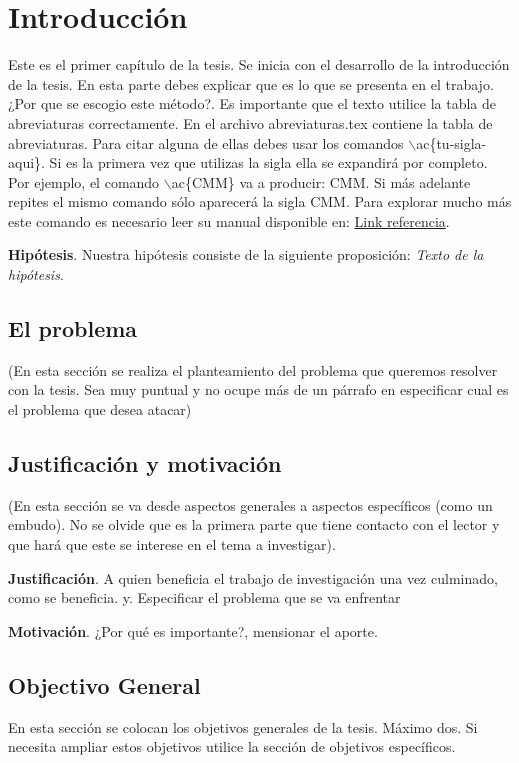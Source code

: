 \chapter{Introducción}
\label{chap:cha1}

Este es el primer capítulo de la tesis. Se inicia con el desarrollo de la introducción de la tesis. En esta parte debes explicar que es lo que se presenta en el trabajo. ¿Por que se escogio este método?. Es importante que el texto utilice la tabla de abreviaturas correctamente. En el archivo abreviaturas.tex contiene la tabla de abreviaturas. Para citar alguna de ellas debes usar los comandos $\backslash$ac\{tu-sigla-aqui\}. Si es la primera vez que utilizas la sigla ella se expandirá por completo. Por ejemplo, el comando $\backslash$ac\{CMM\} va a producir: \ac{CMM}. Si más adelante repites el mismo comando sólo aparecerá la sigla \ac{CMM}. Para explorar mucho más este comando es necesario leer su manual disponible en: \href{http://www.ctan.org/tex-archive/macros/latex/contrib/acronym/}{Link referencia}.


\textbf{Hipótesis}.
Nuestra hipótesis consiste de la siguiente proposición: \textit{ Texto de la hipótesis}.


\section{El problema}
(En esta sección se realiza el planteamiento del problema que queremos resolver con la tesis. Sea muy puntual y no ocupe más de un párrafo en especificar cual es el problema que desea atacar)


\section{Justificación y motivación}
(En esta sección se va desde aspectos generales a aspectos específicos (como un embudo). No se olvide que es la primera parte que tiene contacto con el lector y que hará que este se interese en el tema a investigar).



\textbf{Justificación}.
A quien beneficia el trabajo de investigación una vez culminado, como se beneficia. y.
Especificar el problema que se va enfrentar 

\textbf{Motivación}.
¿Por qué es importante?, mensionar el aporte.


\section{Objectivo General}
En esta sección se colocan los objetivos generales de la tesis. Máximo dos. Si necesita ampliar estos objetivos utilice la sección de objetivos específicos.


